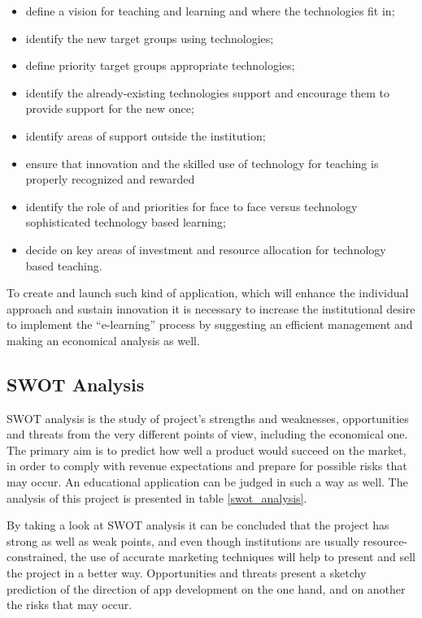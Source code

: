 \begin{itemize}
  \item define a vision for teaching and learning and where the technologies fit in;
  \item identify the new target groups using technologies;
  \item define priority target groups appropriate technologies;
  \item identify the already-existing technologies support and encourage them to provide support for the new once;
  \item identify areas of support outside the institution;
  \item ensure that innovation and the skilled use of technology for teaching is properly recognized and rewarded
  \item identify the role of and priorities for face to face versus technology sophisticated technology     based learning;
  \item decide on key areas of investment and resource allocation for technology based teaching.
\end{itemize}

To create and launch such kind of application, which will enhance the individual approach and sustain innovation it is necessary to increase the institutional desire to implement the “e-learning” process by suggesting an efficient management and making an economical analysis as well.

\subsection{SWOT Analysis}
SWOT analysis is the study of project’s strengths and weaknesses, opportunities and threats from the very different points of view, including the economical one. The primary aim is to predict how well a product would succeed on the market, in order to comply with revenue expectations and prepare for possible risks that may occur. An educational application can be judged in such a way as well. The analysis of this project is presented in table \ref{swot_analysis}.

By taking a look at SWOT analysis it can be concluded that the project has strong as well as      weak points, and even though institutions are usually resource-constrained, the use of accurate marketing techniques will help to present and sell the project in a better way. Opportunities and threats present a sketchy prediction of the direction of app development on the one hand, and on another the risks that may occur.

